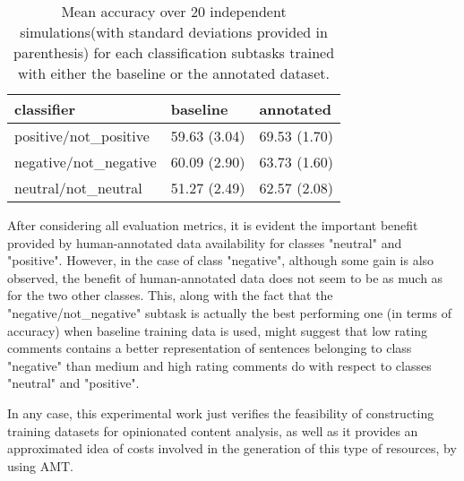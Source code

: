\begin{table}
\begin{tabular}{|l|l|l|}
\hline
classifier &baseline &annotated \\ 
\hline
positive/not_positive &59.63 (3.04) &69.53 (1.70) \\ 
\hline
negative/not_negative &60.09 (2.90) &63.73 (1.60) \\ 
\hline
neutral/not_neutral &51.27 (2.49) &62.57 (2.08) \\ 
\hline
\end{tabular}
\caption{Mean accuracy over 20 independent simulations(with standard deviations provided in parenthesis) 
for each classification subtasks trained with either the baseline or the annotated dataset.}
\label{tc_accu}
\end{table}

After considering all evaluation metrics, it is evident the important benefit provided by human-annotated data 
availability for classes "neutral" and "positive". However, in the case of class "negative", although some 
gain is also observed, the benefit of human-annotated data does not seem to be as much as for the two other 
classes. This, along with the fact that the "negative/not_negative" subtask is actually the best performing
one (in terms of accuracy) when baseline training data is used, might suggest that low rating comments contains 
a better representation of sentences belonging to class "negative" than medium and high rating comments do with
respect to classes "neutral" and "positive". 

In any case, this experimental work just verifies the feasibility of constructing training datasets for
opinionated content analysis, as well as it provides an approximated idea of costs involved in the generation
of this type of resources, by using AMT.


